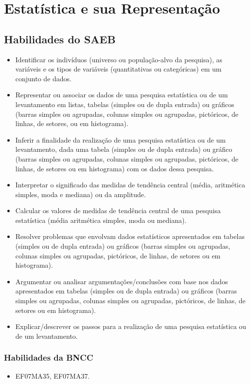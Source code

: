 \chapter{Estatística e sua
Representação}

\section{Habilidades do SAEB }
\begin{itemize}
\item Identificar os indivíduos (universo ou
população-alvo da pesquisa), as variáveis e os tipos de variáveis
(quantitativas ou categóricas) em um conjunto de dados.
\item
  Representar ou associar os dados de uma pesquisa estatística ou de um
  levantamento em listas, tabelas (simples ou de dupla entrada) ou
  gráficos (barras simples ou agrupadas, colunas simples ou agrupadas,
  pictóricos, de linhas, de setores, ou em histograma).
\item
  Inferir a finalidade da realização de uma pesquisa estatística ou de
  um levantamento, dada uma tabela (simples ou de dupla entrada) ou
  gráfico (barras simples ou agrupadas, colunas simples ou agrupadas,
  pictóricos, de linhas, de setores ou em histograma) com os dados dessa
  pesquisa.
  \item
  Interpretar o significado das medidas de tendência central (média,
  aritmética simples, moda e mediana) ou da amplitude.
\item
  Calcular os valores de medidas de tendência central de uma pesquisa
  estatística (média aritmética simples, moda ou mediana).
\item
  Resolver problemas que envolvam dados estatísticos apresentados em
  tabelas (simples ou de dupla entrada) ou gráficos (barras simples ou
  agrupadas, colunas simples ou agrupadas, pictóricos, de linhas, de
  setores ou em histograma).
\item
  Argumentar ou analisar argumentações/conclusões com base nos dados
  apresentados em tabelas (simples ou de dupla entrada) ou gráficos
  (barras simples ou agrupadas, colunas simples ou agrupadas,
  pictóricos, de linhas, de setores ou em histograma).
\item
  Explicar/descrever os passos para a realização de uma pesquisa
  estatística ou de um levantamento.
\end{itemize}

\subsection{Habilidades da BNCC }
\begin{itemize}
\item EF07MA35, EF07MA37. 
\end{itemize}

